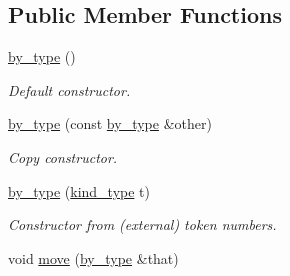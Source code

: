 \subsection*{Public Member Functions}
\begin{DoxyCompactItemize}
\item 
\hypertarget{structyy_1_1parser_1_1by__type_a16c7227367f85b611980ed547f545483}{}\hyperlink{structyy_1_1parser_1_1by__type_a16c7227367f85b611980ed547f545483}{by\+\_\+type} ()\label{structyy_1_1parser_1_1by__type_a16c7227367f85b611980ed547f545483}

\begin{DoxyCompactList}\small\item\em Default constructor. \end{DoxyCompactList}\item 
\hypertarget{structyy_1_1parser_1_1by__type_aa99c31c49c133c9ec3fe3f06ee30692c}{}\hyperlink{structyy_1_1parser_1_1by__type_aa99c31c49c133c9ec3fe3f06ee30692c}{by\+\_\+type} (const \hyperlink{structyy_1_1parser_1_1by__type}{by\+\_\+type} \&other)\label{structyy_1_1parser_1_1by__type_aa99c31c49c133c9ec3fe3f06ee30692c}

\begin{DoxyCompactList}\small\item\em Copy constructor. \end{DoxyCompactList}\item 
\hypertarget{structyy_1_1parser_1_1by__type_a7f43ae4d6b5ae70d2a7ef537c1ea42b2}{}\hyperlink{structyy_1_1parser_1_1by__type_a7f43ae4d6b5ae70d2a7ef537c1ea42b2}{by\+\_\+type} (\hyperlink{structyy_1_1parser_1_1by__type_af8757490fd5397ad574e9fee1b80fa25}{kind\+\_\+type} t)\label{structyy_1_1parser_1_1by__type_a7f43ae4d6b5ae70d2a7ef537c1ea42b2}

\begin{DoxyCompactList}\small\item\em Constructor from (external) token numbers. \end{DoxyCompactList}\item 
\hypertarget{structyy_1_1parser_1_1by__type_a68911dec3423e0748fd56f369d1b5d10}{}void \hyperlink{structyy_1_1parser_1_1by__type_a68911dec3423e0748fd56f369d1b5d10}{move} (\hyperlink{structyy_1_1parser_1_1by__type}{by\+\_\+type} \&that)\label{structyy_1_1parser_1_1by__type_a68911dec3423e0748fd56f369d1b5d10}


\end{DoxyCompactItemize}
